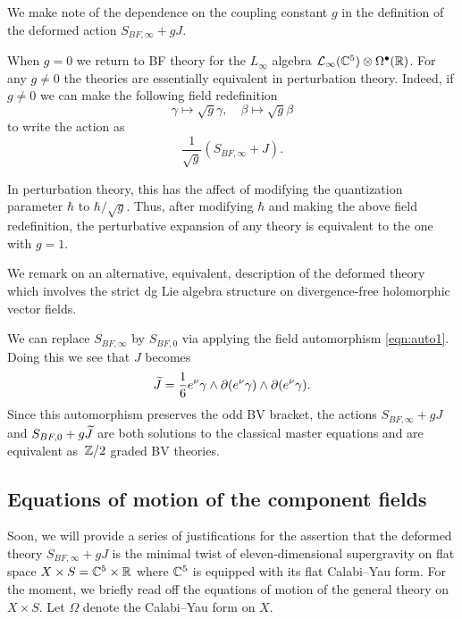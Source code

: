 \parsec[s:coupling]

We make note of the dependence on the coupling constant $g$ in the definition of the deformed action $S_{BF,\infty} + g J$. 

When $g = 0$ we return to BF theory for the $L_\infty$ algebra $\mathcal L_\infty(\mathbb C^5) \otimes \Omega^\bullet(\mathbb R)$. 
For any $g \ne 0$ the theories are essentially equivalent in perturbation theory. 
Indeed, if $g \ne 0$ we can make the following field redefinition 
\[
\gamma \mapsto \sqrt{g} \gamma, \quad \beta \mapsto \sqrt{g} \beta 
\]
to write the action as 
\[
\frac{1}{\sqrt{g}} \left(S_{BF,\infty} + J \right)  .
\]

In perturbation theory, this has the affect of modifying the quantization parameter $\hbar$ to $\hbar / \sqrt{g}$.
Thus, after modifying $\hbar$ and making the above field redefinition, the perturbative expansion of any theory is equivalent to the one with $g = 1$. 

\parsec[s:altdfn]

We remark on an alternative, equivalent, description of the deformed theory which involves the strict dg Lie algebra structure on divergence-free holomorphic vector fields.

We can replace $S_{BF,\infty}$ by $S_{BF,0}$ via applying the field automorphism \eqref{eqn:auto1}.
Doing this we see that $J$ becomes 
\[
\widetilde{J} = \frac16 e^\nu \gamma \wedge \partial (e^\nu \gamma) \wedge \partial(e^\nu \gamma) .
\]
Since this automorphism preserves the odd BV bracket, the actions $S_{BF,\infty} + g J$ and $S_{BF, 0} + g \widetilde{J}$ are both solutions to the classical master equations and are equivalent as~$\mathbb Z/2$ graded BV theories.

\subsection{Equations of motion of the component fields} \label{s:components}

Soon, we will provide a series of justifications for the assertion that the deformed theory $S_{BF, \infty} + g J$ is the minimal twist of eleven-dimensional supergravity on flat space $X \times S = \mathbb C^5 \times \mathbb R$ where $\mathbb C^5$ is equipped with its flat Calabi--Yau form. 
For the moment, we briefly read off the equations of motion of the general theory on $X \times S$.
Let $\Omega$ denote the Calabi--Yau form on $X$. 

